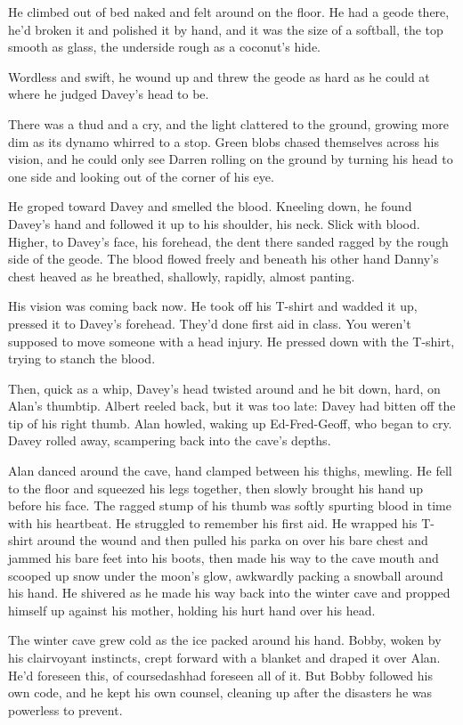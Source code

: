 He climbed out of bed naked and felt around on the floor.  He had a
geode there, he'd broken it and polished it by hand, and it was the
size of a softball, the top smooth as glass, the underside rough as a
coconut's hide.

Wordless and swift, he wound up and threw the geode as hard as he
could at where he judged Davey's head to be.

There was a thud and a cry, and the light clattered to the ground,
growing more dim as its dynamo whirred to a stop.  Green blobs chased
themselves across his vision, and he could only see Darren rolling on
the ground by turning his head to one side and looking out of the
corner of his eye.

He groped toward Davey and smelled the blood.  Kneeling down, he found
Davey's hand and followed it up to his shoulder, his neck.  Slick with
blood.  Higher, to Davey's face, his forehead, the dent there sanded
ragged by the rough side of the geode.  The blood flowed freely and
beneath his other hand Danny's chest heaved as he breathed, shallowly,
rapidly, almost panting.

His vision was coming back now.  He took off his T-shirt and wadded it
up, pressed it to Davey's forehead.  They'd done first aid in class. 
You weren't supposed to move someone with a head injury.  He pressed
down with the T-shirt, trying to stanch the blood.

Then, quick as a whip, Davey's head twisted around and he bit down,
hard, on Alan's thumbtip.  Albert reeled back, but it was too late: 
Davey had bitten off the tip of his right thumb.  Alan howled, waking
up Ed-Fred-Geoff, who began to cry.  Davey rolled away, scampering
back into the cave's depths.

Alan danced around the cave, hand clamped between his thighs, mewling. 
He fell to the floor and squeezed his legs together, then slowly
brought his hand up before his face.  The ragged stump of his thumb
was softly spurting blood in time with his heartbeat.  He struggled to
remember his first aid.  He wrapped his T-shirt around the wound and
then pulled his parka on over his bare chest and jammed his bare feet
into his boots, then made his way to the cave mouth and scooped up
snow under the moon's glow, awkwardly packing a snowball around his
hand.  He shivered as he made his way back into the winter cave and
propped himself up against his mother, holding his hurt hand over his
head.

The winter cave grew cold as the ice packed around his hand.  Bobby,
woken by his clairvoyant instincts, crept forward with a blanket and
draped it over Alan.  He'd foreseen this, of coursedash{}had foreseen all
of it.  But Bobby followed his own code, and he kept his own counsel,
cleaning up after the disasters he was powerless to prevent.

